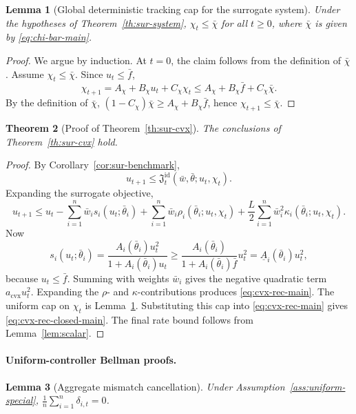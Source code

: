 \documentclass{article}
\newtheorem{theorem}{Theorem}[section]
\newtheorem{lemma}[theorem]{Lemma}
\theoremstyle{definition}
\begin{document}
\begin{lemma}[Global deterministic tracking cap for the surrogate system]
\label{lem:sur-chi-cap}
Under the hypotheses of Theorem~\ref{th:sur-system}, $
\chi_t\le \bar\chi$
for all $t\ge 0$,
where $\bar\chi$ is given by \eqref{eq:chi-bar-main}.
\end{lemma}

\begin{proof}
We argue by induction. At $t=0$, the claim follows from the definition of
$\bar\chi$. Assume $\chi_t\le \bar\chi$. Since $u_t\le \bar f$,
\[
\chi_{t+1}
=
A_\chi+B_\chi u_t+C_\chi\chi_t
\le
A_\chi+B_\chi\bar f+C_\chi\bar\chi.
\]
By the definition of $\bar\chi$,
$(1-C_\chi)\bar\chi\ge A_\chi+B_\chi\bar f$, hence $\chi_{t+1}\le \bar\chi$.
\end{proof}

\begin{theorem}[Proof of Theorem~\ref{th:sur-cvx}]
\label{th:sur-cvx-proof}
The conclusions of Theorem~\ref{th:sur-cvx} hold.
\end{theorem}

\begin{proof}
By Corollary~\ref{cor:sur-benchmark},
\[
u_{t+1}
\le
\mathfrak J_t^{\mathrm{id}}(\bar w,\bar\theta;u_t,\chi_t).
\]
Expanding the surrogate objective,
\[
u_{t+1}
\le
u_t
-
\sum_{i=1}^n \bar w_i s_i(u_t;\bar\theta_i)
+
\sum_{i=1}^n \bar w_i \rho_i(\bar\theta_i;u_t,\chi_t)
+
\frac{L}{2}\sum_{i=1}^n \bar w_i^2 \kappa_i(\bar\theta_i;u_t,\chi_t).
\]
Now
\[
s_i(u_t;\bar\theta_i)
=
\frac{A_i(\bar\theta_i)u_t^2}{1+A_i(\bar\theta_i)u_t}
\ge
\frac{A_i(\bar\theta_i)}{1+A_i(\bar\theta_i)\bar f}u_t^2
=
\underline A_i(\bar\theta_i)u_t^2,
\]
because $u_t\le \bar f$. Summing with weights $\bar w_i$ gives the negative
quadratic term $a_{\mathrm{cvx}}u_t^2$. Expanding the $\rho$- and
$\kappa$-contributions produces \eqref{eq:cvx-rec-main}. The uniform cap on
$\chi_t$ is Lemma~\ref{lem:sur-chi-cap}. Substituting this cap into
\eqref{eq:cvx-rec-main} gives \eqref{eq:cvx-rec-closed-main}. The final rate
bound follows from Lemma~\ref{lem:scalar}.
\end{proof}

\paragraph{Uniform-controller Bellman proofs.}

\begin{lemma}[Aggregate mismatch cancellation]
\label{lem:cancellation}
Under Assumption~\ref{ass:uniform-special}, $
\frac1n\sum_{i=1}^n \delta_{i,t}=0$.
\end{lemma}
\end{document}
